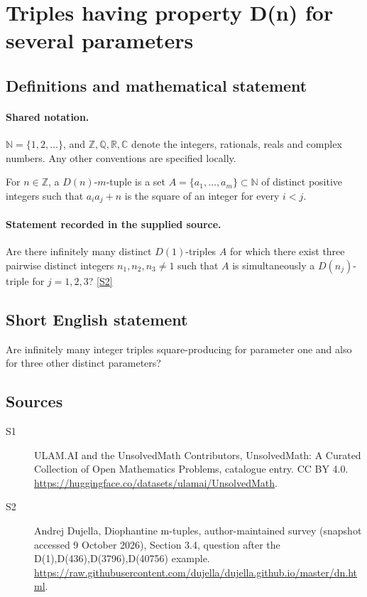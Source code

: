 \documentclass[11pt]{article}
\newcommand{\sref}[2]{\hyperlink{source:#1:#2}{[S#2]}}
\begin{document}
\section{Triples having property D(n) for several parameters}\label{statement}

\subsection{Definitions and mathematical statement}

\paragraph{Shared notation.}$\mathbb N=\{1,2,\ldots\}$, and $\mathbb Z,\mathbb Q,\mathbb R,\mathbb C$ denote the integers, rationals, reals and complex numbers. Any other conventions are specified locally.


For $n\in\mathbb Z$, a $D(n)$-$m$-tuple is a set $A=\{a_1,\ldots,a_m\}\subset\mathbb N$ of distinct positive integers such that $a_i a_j+n$ is the square of an integer for every $i<j$.
\paragraph{Statement recorded in the supplied source.}
Are there infinitely many distinct $D(1)$-triples $A$ for which there exist three pairwise distinct integers $n_1,n_2,n_3\ne1$ such that $A$ is simultaneously a $D(n_j)$-triple for $j=1,2,3$? \sref{statement}{2}
\subsection{Short English statement}
Are infinitely many integer triples square-producing for parameter one and also for three other distinct parameters?
\subsection{Sources}
\begin{description}
\item[\hypertarget{source:statement:1}{S1}] ULAM.AI and the UnsolvedMath Contributors, UnsolvedMath: A Curated Collection of Open Mathematics Problems, catalogue entry. CC BY 4.0. \url{https://huggingface.co/datasets/ulamai/UnsolvedMath}.
\item[\hypertarget{source:statement:2}{S2}] Andrej Dujella, Diophantine m-tuples, author-maintained survey (snapshot accessed 9 October 2026), Section 3.4, question after the D(1),D(436),D(3796),D(40756) example. \url{https://raw.githubusercontent.com/dujella/dujella.github.io/master/dn.html}.
\end{description}
\label{end:statement}
\end{document}
